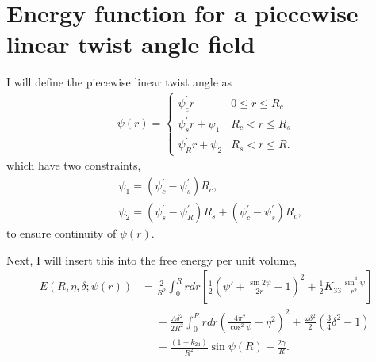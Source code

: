 \documentclass[12pt]{article}
\begin{document}


\section{Energy function for a piecewise linear twist angle field}
I will define the piecewise linear twist angle as
\begin{align}\label{eq:basicpiecewise}
\psi(r)=
\begin{cases}
	\psi_c^{\prime} r					& 0 \leq r \leq R_c \\
	\psi_s^{\prime} r +\psi_1			& R_c < r \leq R_s \\
	\psi_R^{\prime}r+\psi_2				& R_s < r \leq R.
\end{cases}
\end{align}
which have two constraints,
\begin{subequations}
\begin{align}
&\psi_1=(\psi_c^{\prime}-\psi_s^{\prime})R_c\label{eq:psi1},\\
&\psi_2=(\psi_s^{\prime}-\psi_R^{\prime})R_s+(\psi_c^{\prime}-\psi_s^{\prime})R_c\label{eq:psi2},
\end{align}
\end{subequations}
to ensure continuity of $\psi(r)$.

Next, I will insert this into the free energy per unit volume,
\begin{align}\label{eq:startE}
E(R,\eta,\delta;\psi(r))&=\frac{2}{R^2}\int_0^{R}rdr\left[\frac{1}{2}\left(\psi'+\frac{\sin2\psi}{2r}-1\right)^2+\frac{1}{2}K_{33}\frac{\sin^4\psi}{r^2}\right]\nonumber\\
&\phantom{=}+\frac{\Lambda\delta^2}{2R^2}\int_0^{R}rdr\left(\frac{4\pi^2}{\cos^2\psi}-\eta^2\right)^2+\frac{\omega\delta^2}{2}\left(\frac{3}{4}\delta^2-1\right)\nonumber\\
&\phantom{=}-\frac{(1+k_{24})}{R^2}\sin\psi(R)+\frac{2\gamma}{R}.
\end{align}
\end{document}
